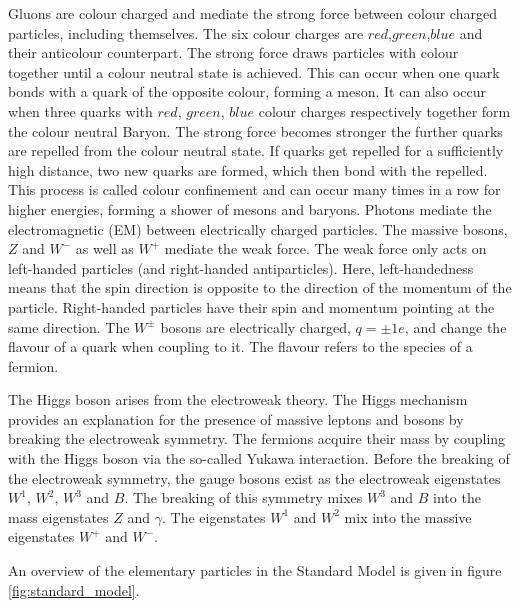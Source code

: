 Gluons are colour charged and mediate the strong force between colour charged particles, including themselves. The six colour charges are $red$,$green$,$blue$ and their anticolour counterpart. The strong force draws particles with colour together until a colour neutral state is achieved. This can occur when one quark bonds with a quark of the opposite colour, forming a meson. It can also occur when three quarks with $red$, $green$, $blue$ colour charges respectively together form the colour neutral Baryon. 
The strong force becomes stronger the further quarks are repelled from the colour neutral state. If quarks get repelled for a sufficiently high distance, two new quarks are formed, which then bond with the repelled. This process is called colour confinement and can occur many times in a row for higher energies, forming a shower of mesons and baryons. 
Photons mediate the electromagnetic (EM) between electrically charged particles. The massive bosons, $Z$ and $W^{-}$ as well as $W^{+}$ mediate the weak force. The weak force only acts on left-handed particles (and right-handed antiparticles). Here, left-handedness means that the spin direction is opposite to the direction of the momentum of the particle. Right-handed particles have their spin and momentum pointing at the same direction. 
The $W^{\pm}$ bosons are electrically charged, $q = \pm 1e$, and change the flavour of a quark when coupling to it. The flavour refers to the species of a fermion. 
 
The Higgs boson arises from the electroweak theory. The Higgs mechanism provides an explanation for the presence of massive leptons and bosons by breaking the electroweak symmetry. The fermions acquire their mass by coupling with the Higgs boson via the so-called Yukawa interaction.
Before the breaking of the electroweak symmetry, the gauge bosons exist as the electroweak eigenstates $W^1$, $W^2$, $W^3$ and $B$. The breaking of this symmetry mixes $W^3$ and $B$ into the mass eigenstates $Z$ and $\gamma$. 
The eigenstates $W^1$ and $W^2$ mix into the massive eigenstates $W^+$ and $W^-$. 

An overview of the elementary particles in the Standard Model is given in figure \ref{fig:standard_model}.

